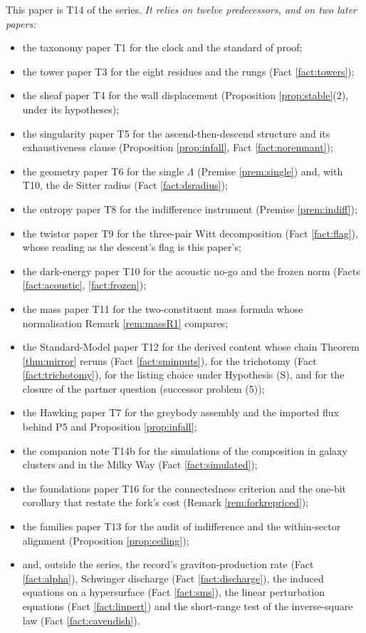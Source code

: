 \documentclass[11pt]{article}
\theoremstyle{definition}
\begin{document}
This paper is T14 of the series. \emph{It relies on twelve predecessors, and on two later papers:}
\begin{itemize}\setlength{\itemsep}{1pt}
\item the taxonomy paper T1 \cite{ButlerT1} for the clock and the standard of proof;
\item the tower paper T3 \cite{ButlerT3} for the eight residues and the rungs (Fact \ref{fact:towers});
\item the sheaf paper T4 \cite{ButlerT4} for the wall displacement (Proposition \ref{prop:stable}(2), under its hypotheses);
\item the singularity paper T5 \cite{ButlerT5} for the ascend-then-descend structure and its exhaustiveness clause (Proposition \ref{prop:infall}, Fact \ref{fact:noremnant});
\item the geometry paper T6 \cite{ButlerT6} for the single $\Lambda$ (Premise \ref{prem:single}) and, with T10, the de Sitter radius (Fact \ref{fact:dsradius});
\item the entropy paper T8 \cite{ButlerT8} for the indifference instrument (Premise \ref{prem:indiff});
\item the twistor paper T9 \cite{ButlerT9} for the three-pair Witt decomposition (Fact \ref{fact:flag}), whose reading as the descent's flag is this paper's;
\item the dark-energy paper T10 \cite{ButlerT10} for the acoustic no-go and the frozen norm (Facts \ref{fact:acoustic}, \ref{fact:frozen});
\item the mass paper T11 \cite{ButlerT11} for the two-constituent mass formula whose normalisation Remark \ref{rem:massR1} compares;
\item the Standard-Model paper T12 \cite{ButlerT12} for the derived content whose chain Theorem \ref{thm:mirror} reruns (Fact \ref{fact:sminputs}), for the trichotomy (Fact \ref{fact:trichotomy}), for the listing choice under Hypothesis (S), and for the closure of the partner question (successor problem (5));
\item the Hawking paper T7 \cite{ButlerT7} for the greybody assembly and the imported flux behind P5 and Proposition \ref{prop:infall};
\item the companion note T14b \cite{ButlerT14b} for the simulations of the composition in galaxy clusters and in the Milky Way (Fact \ref{fact:simulated});
\item the foundations paper T16 \cite{ButlerT16} for the connectedness criterion and the one-bit corollary that restate the fork's cost (Remark \ref{rem:forkrepriced});
\item the families paper T13 \cite{ButlerT13} for the audit of indifference and the within-sector alignment (Proposition \ref{prop:ceiling});
\item and, outside the series, the record's graviton-production rate (Fact \ref{fact:alpha}), Schwinger discharge (Fact \ref{fact:discharge}), the induced equations on a hypersurface (Fact \ref{fact:sms}), the linear perturbation equations (Fact \ref{fact:linpert}) and the short-range test of the inverse-square law (Fact \ref{fact:cavendish}).
\end{itemize}
\end{document}
